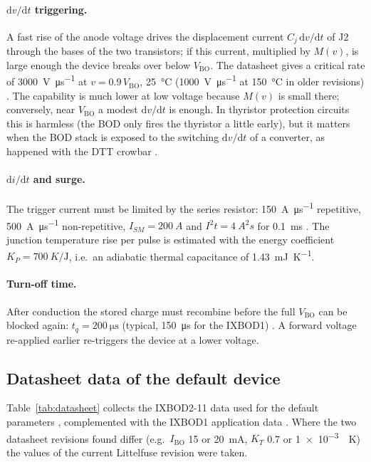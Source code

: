 \documentclass[11pt,a4paper]{article}
\newcommand{\Vbo}{V_{\mathrm{BO}}}
\newcommand{\Ibo}{I_{\mathrm{BO}}}
\newcommand{\dvdt}{\mathrm{d}v/\mathrm{d}t}
\begin{document}
\paragraph{$\dvdt$ triggering.} A fast rise of the anode voltage drives the displacement current $C_j\,\dvdt$ of J2 through the bases of the two transistors; if this current, multiplied by $M(v)$, is large enough the device breaks over below $\Vbo$. The datasheet gives a critical rate of \SI{3000}{V\per\micro\second} at $v=0.9\,\Vbo$, \SI{25}{\celsius} (\SI{1000}{V\per\micro\second} at \SI{150}{\celsius} in older revisions) \cite{ixbod2}. The capability is much lower at low voltage because $M(v)$ is small there; conversely, near $\Vbo$ a modest $\dvdt$ is enough. In thyristor protection circuits this is harmless (the BOD only fires the thyristor a little early), but it matters when the BOD stack is exposed to the switching $\dvdt$ of a converter, as happened with the DTT crowbar \cite{crowbardtt}.

\paragraph{$\mathrm{d}i/\mathrm{d}t$ and surge.} The trigger current must be limited by the series resistor: \SI{150}{A\per\micro\second} repetitive, \SI{500}{A\per\micro\second} non-repetitive, $I_{SM}=\SI{200}{A}$ and $I^2t=\SI{4}{A^2 s}$ for \SI{0.1}{ms} \cite{ixbod2}. The junction temperature rise per pulse is estimated with the energy coefficient $K_P=\SI{700}{K\per\joule}$, i.e.\ an adiabatic thermal capacitance of \SI{1.43}{mJ\per\kelvin}.

\paragraph{Turn-off time.} After conduction the stored charge must recombine before the full $\Vbo$ can be blocked again: $t_q=\SI{200}{\micro\second}$ (typical, \SI{150}{\micro\second} for the IXBOD1) \cite{ixbod2,ixbod1}. A forward voltage re-applied earlier re-triggers the device at a lower voltage.

\subsection{Datasheet data of the default device}
Table~\ref{tab:datasheet} collects the IXBOD2-11 data used for the default parameters \cite{ixbod2}, complemented with the IXBOD1 application data \cite{ixysapp}. Where the two datasheet revisions found differ (e.g.\ $\Ibo$ 15 or \SI{20}{mA}, $K_T$ 0.7 or \SI{1e-3}{\per\kelvin}) the values of the current Littelfuse revision were taken.
\end{document}
